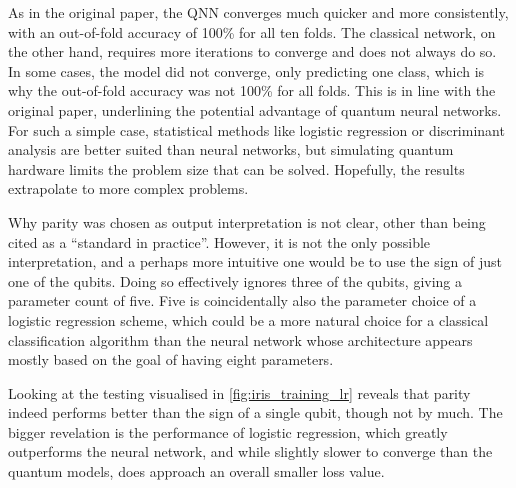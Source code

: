 As in the original paper, the QNN converges much quicker and more consistently, with an out-of-fold accuracy of 100\% for all ten folds.
The classical network, on the other hand, requires more iterations to converge and does not always do so.
In some cases, the model did not converge, only predicting one class, which is why the out-of-fold accuracy was not 100\% for all folds.
This is in line with the original paper, underlining the potential advantage of quantum neural networks.
For such a simple case, statistical methods like logistic regression or discriminant analysis are better suited than neural networks, but simulating quantum hardware limits the problem size that can be solved.
Hopefully, the results extrapolate to more complex problems.

Why parity was chosen as output interpretation is not clear, other than being cited as a \enquote{standard in practice}.
However, it is not the only possible interpretation, and a perhaps more intuitive one would be to use the sign of just one of the qubits.
Doing so effectively ignores three of the qubits, giving a parameter count of five.
Five is coincidentally also the parameter choice of a logistic regression scheme, which could be a more natural choice for a classical classification algorithm than the neural network whose architecture appears mostly based on the goal of having eight parameters.

Looking at the testing visualised in \cref{fig:iris_training_lr} reveals that parity indeed performs better than the sign of a single qubit, though not by much.
The bigger revelation is the performance of logistic regression, which greatly outperforms the neural network, and while slightly slower to converge than the quantum models, does approach an overall smaller loss value.

